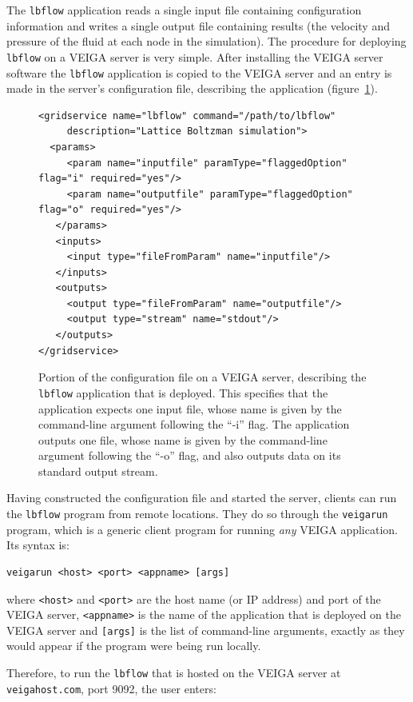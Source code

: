 \documentclass[a4paper]{article}
\begin{document}
\begin{multicols}{2}
The {\tt lbflow} application reads a single input file containing configuration information and writes a single output file containing results (the velocity and pressure of the fluid at each node in the simulation).  The procedure for deploying {\tt lbflow} on a VEIGA server is very simple.  After installing the VEIGA server software the {\tt lbflow} application is copied to the VEIGA server and an entry is made in the server's configuration file, describing the application (figure~\ref{fig:lbflowconfig}).

\begin{figure}
\centering
\begin{verbatim}
<gridservice name="lbflow" command="/path/to/lbflow"
     description="Lattice Boltzman simulation">
  <params>
     <param name="inputfile" paramType="flaggedOption" flag="i" required="yes"/>
     <param name="outputfile" paramType="flaggedOption" flag="o" required="yes"/>
   </params>
   <inputs>
     <input type="fileFromParam" name="inputfile"/>
   </inputs>
   <outputs>
     <output type="fileFromParam" name="outputfile"/>
     <output type="stream" name="stdout"/>
   </outputs>
</gridservice>
\end{verbatim}
\caption{Portion of the configuration file on a VEIGA server, describing the {\tt lbflow} application that is deployed.  This specifies that the application expects one input file, whose name is given by the command-line argument following the ``-i'' flag.  The application outputs one file, whose name is given by the command-line argument following the ``-o'' flag, and also outputs data on its standard output stream.}
\label{fig:lbflowconfig}
\end{figure}

Having constructed the configuration file and started the server, clients can run the {\tt lbflow} program from remote locations.  They do so through the {\tt veigarun} program, which is a generic client program for running {\em any\/} VEIGA application.  Its syntax is:

\begin{verbatim}
veigarun <host> <port> <appname> [args]
\end{verbatim}
where {\tt <host>} and {\tt <port>\/} are the host name (or IP address) and port of the VEIGA server, {\tt <appname>} is the name of the application that is deployed on the VEIGA server and {\tt [args]} is the list of command-line arguments, exactly as they would appear if the program were being run locally.

Therefore, to run the {\tt lbflow} that is hosted on the VEIGA server at {\tt veigahost.com}, port 9092, the user enters:


\end{multicols}
\end{document}
